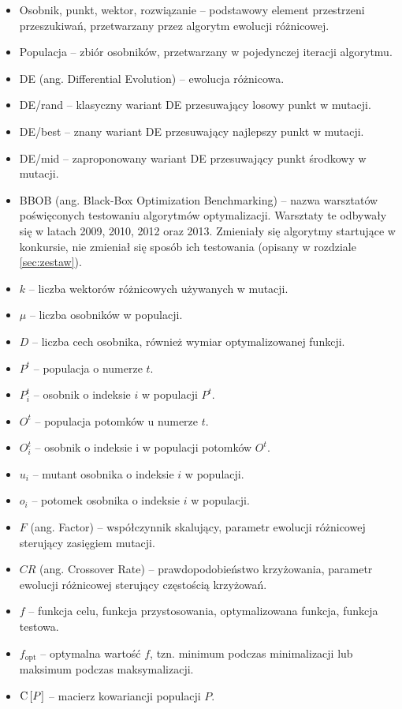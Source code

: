 \documentclass[a4paper,onecolumn,oneside,12pt,wide,floatssmall]{mwrep}
\def\C{{\rm C}\,}
\theoremstyle{definition}
\theoremstyle{plain}%
\theoremstyle{remark}
\begin{document}
\begin{itemize}
 \item[] Osobnik, punkt, wektor, rozwiązanie -- podstawowy element przestrzeni przeszukiwań, 
przetwarzany przez algorytm ewolucji różnicowej.
 \item[] Populacja -- zbiór osobników, przetwarzany w pojedynczej iteracji algorytmu.
 \item[] DE (ang. Differential Evolution) -- ewolucja różnicowa.
 \item[] DE/rand -- klasyczny wariant DE przesuwający losowy punkt w mutacji.
 \item[] DE/best -- znany wariant DE przesuwający najlepszy punkt w mutacji.
 \item[] DE/mid -- zaproponowany wariant DE przesuwający punkt środkowy w mutacji.
 \item[] BBOB (ang. Black-Box Optimization Benchmarking) -- nazwa warsztatów poświęconych testowaniu algorytmów optymalizacji. 
Warsztaty te odbywały się w latach 2009, 2010, 2012 oraz 2013. Zmieniały się algorytmy startujące w konkursie, nie zmieniał
się sposób ich testowania (opisany w rozdziale \ref{sec:zestaw}).
 \item[] $k$ -- liczba wektorów różnicowych używanych w mutacji.
 \item[] $\mu$ -- liczba osobników w populacji.
 \item[] $D$ -- liczba cech osobnika, również wymiar optymalizowanej funkcji.
 \item[] $P^t$ -- populacja o numerze $t$.
 \item[] $P_i^t$ -- osobnik o indeksie $i$ w populacji $P^t$.
 \item[] $O^t$ -- populacja potomków u numerze $t$.
 \item[] $O_i^t$ -- osobnik o indeksie i w populacji potomków $O^t$.
 \item[] $u_i$ -- mutant osobnika o indeksie $i$ w populacji.
 \item[] $o_i$ -- potomek osobnika o indeksie $i$ w populacji.
 \item[] $F$ (ang. Factor) -- współczynnik skalujący, parametr ewolucji różnicowej sterujący zasięgiem mutacji.
 \item[] $CR$ (ang. Crossover Rate) -- prawdopodobieństwo krzyżowania, parametr ewolucji różnicowej sterujący częstością krzyżowań.
 \item[] $f$ -- funkcja celu, funkcja przystosowania, optymalizowana funkcja, funkcja testowa.
 \item[] $f_\text{opt}$ -- optymalna wartość $f$, tzn. minimum podczas minimalizacji lub maksimum podczas maksymalizacji.
 \item[] $\C[P]$ -- macierz kowariancji populacji $P$.
\end{itemize}
\end{document}
